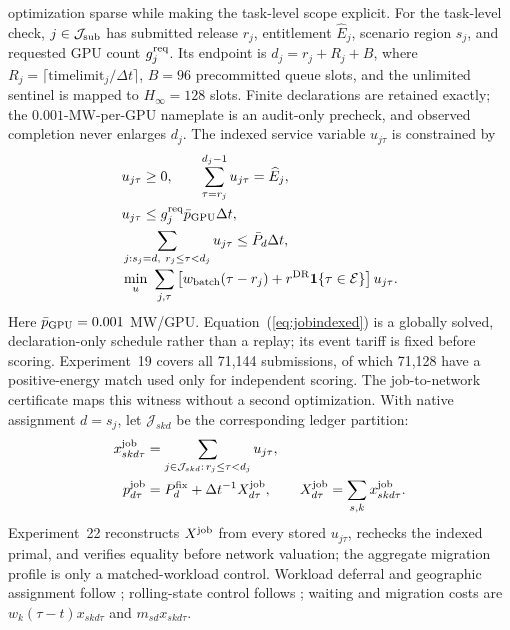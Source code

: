 \documentclass[10pt,journal]{IEEEtran}
\newcommand{\dt}{\Delta t}
\begin{document}
optimization sparse while making the task-level scope explicit.
For the task-level check, \(j\in\mathcal J_{\rm sub}\) has submitted release
\(r_j\), entitlement \(\widehat E_j\), scenario region \(s_j\), and requested GPU count
\(g_j^{\rm req}\). Its endpoint is \(d_j=r_j+R_j+B\), where
\(R_j=\lceil\mathrm{timelimit}_j/\dt\rceil\), \(B=96\) precommitted queue slots,
and the unlimited sentinel is mapped to \(H_{\infty}=128\) slots. Finite
declarations are retained exactly; the $0.001$-MW-per-GPU nameplate is an
audit-only precheck, and observed completion never enlarges \(d_j\). The indexed
service variable \(u_{j\tau}\) is constrained by
\begin{equation}
\begin{aligned}
 &u_{j\tau}\geq0,\qquad
   \sum_{\tau=r_j}^{d_j-1}u_{j\tau}=\widehat E_j,\\
 &u_{j\tau}\leq g_j^{\rm req}\bar p_{\rm GPU}\dt,\\
 &\sum_{j:s_j=d,\ r_j\leq\tau<d_j}u_{j\tau}
   \leq \bar P_d\dt,\\[-2pt]
 &\min_u\ \sum_{j,\tau}
   \left[w_{\rm batch}(\tau-r_j)+r^{\rm DR}\mathbf1\{\tau\in\mathcal E\}\right]u_{j\tau}.
\end{aligned}
\label{eq:jobindexed}
\end{equation}
Here \(\bar p_{\rm GPU}=0.001\) MW/GPU. Equation~(\ref{eq:jobindexed}) is a
globally solved, declaration-only schedule rather than a replay; its event
tariff is fixed before scoring. Experiment~19 covers all 71,144 submissions,
of which 71,128 have a positive-energy match used only for independent scoring.
The job-to-network certificate maps this witness without a second optimization.
With native assignment \(d=s_j\), let $\mathcal J_{skd}$ be the corresponding
ledger partition:
\begin{align}
 x^{\rm job}_{skd\tau}&=\sum_{j\in\mathcal J_{skd}:\,r_j\leq\tau<d_j}
 u_{j\tau},\\
 p^{\rm job}_{d\tau}&=P_d^{\rm fix}+\dt^{-1}X^{\rm job}_{d\tau},\qquad
 X^{\rm job}_{d\tau}=\sum_{s,k}x^{\rm job}_{skd\tau}.
 \label{eq:jobnetworkcoupling}
\end{align}
Experiment~22 reconstructs $X^{\rm job}$ from every stored $u_{j\tau}$,
rechecks the indexed primal, and verifies equality before network valuation;
the aggregate migration profile is only a matched-workload control. Workload
deferral and geographic assignment follow \cite{cao2022flexibility,cao2024nonwire};
rolling-state control follows \cite{zhang2023receding}; waiting and migration
costs are $w_k(\tau-t)x_{skd\tau}$ and $m_{sd}x_{skd\tau}$.
\end{document}
